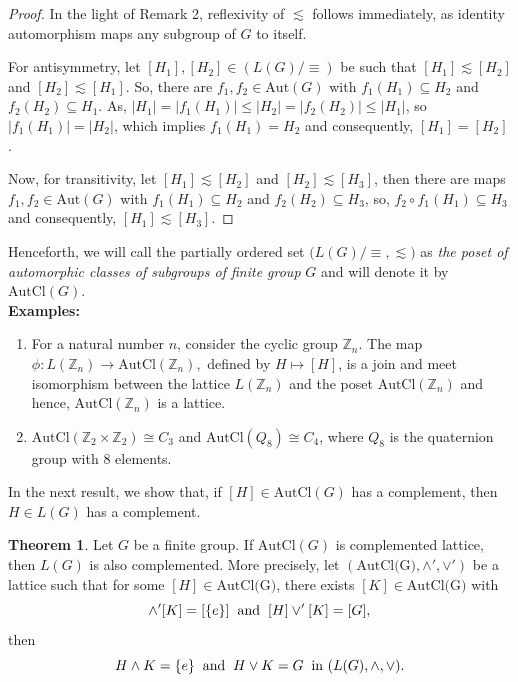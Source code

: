 \documentclass{article}
\newcommand\quotientthree[2]{{#1}\Big/{#2}}
\theoremstyle{definition}
\newtheorem{theorem}{Theorem}[section]
\begin{document}
\begin{proof}
    In the light of Remark 2, reflexivity of $\lesssim$ follows immediately, as identity automorphism maps any subgroup of $G$ to itself. \par 
For antisymmetry, let $[H_1],[H_2] \in (\quotientthree{L(G)}{\equiv})$ be such that $[H_1]\lesssim [H_2]$ and $[H_2]\lesssim [H_1]$. So, there are $f_1, f_2 \in \text{Aut}(G)$ with $f_1(H_1)\subseteq H_2$ and $f_2(H_2)\subseteq H_1$. As, $|H_1|=|f_1(H_1)|\le |H_2|=|f_2(H_2)|\le |H_1|$, so $|f_1(H_1)|=|H_2|$, which implies $f_1(H_1)=H_2$ and consequently, $[H_1]=[H_2]$. \par
Now, for transitivity, let $[H_1]\lesssim[H_2]$ and $[H_2]\lesssim [H_3]$, then there are maps $f_1,f_2\in \text{Aut}(G)$ with $f_1(H_1)\subseteq H_2$ and $f_2(H_2)\subseteq H_3$, so, $f_2\circ f_1(H_1)\subseteq H_3$ and consequently, $[H_1]\lesssim [H_3]$. 
\end{proof}
 Henceforth, we will call the partially ordered set $\biggl ( \quotientthree{L(G)}{\equiv}, \lesssim \biggr)$ as \emph{the poset of automorphic classes of subgroups of finite group} $G$ and will denote it by $\text{AutCl}(G)$. \vspace{0.2cm}\\
 \textbf{Examples:} \begin{enumerate}
     \item For a natural number $n$, consider the cyclic group $\mathbb{Z}_n$. The map $\phi: L(\mathbb{Z}_n) \to \text{AutCl}(\mathbb{Z}_n),$ defined by $H \longmapsto [H]$, is a join and meet isomorphism between the lattice $L(\mathbb{Z}_n)$ and the poset $\text{AutCl}(\mathbb{Z}_n)$ and hence, $\text{AutCl}(\mathbb{Z}_n)$ is a lattice.
     \item $\text{AutCl}(\mathbb{Z}_2 \times \mathbb{Z}_2)\cong C_3$ and $\text{AutCl}(Q_8)\cong C_4$, where $Q_8$ is the quaternion group with 8 elements.
 \end{enumerate}
 In the next result, we show that, if $[H]\in \text{AutCl}(G)$ has a complement, then $H\in L(G)$ has a complement. 
\begin{theorem}
    Let $G$ be a finite group. If $\text{AutCl}(G)$ is complemented lattice, then $L(G)$ is also complemented. More precisely, let $(\text{AutCl(G)}, \wedge',\vee')$  be a lattice such that for some $[H]\in \text{AutCl(G)}$, there exists $[K]\in \text{AutCl(G)}$ with \begin{equation*}
    [H]\wedge ' [K]=[\{e\}] \hspace{0.2cm} \text{and} \hspace{0.2cm} [H]\vee' [K]=[G],
\end{equation*}  
then \begin{equation*}
    H\wedge K= \{e\} \hspace{0.2cm} \text{and} \hspace{0.2cm} H \vee K=G \hspace{0.2cm}\text{in } (L(G),\wedge,\vee).
\end{equation*}
\end{theorem}
\end{document}
